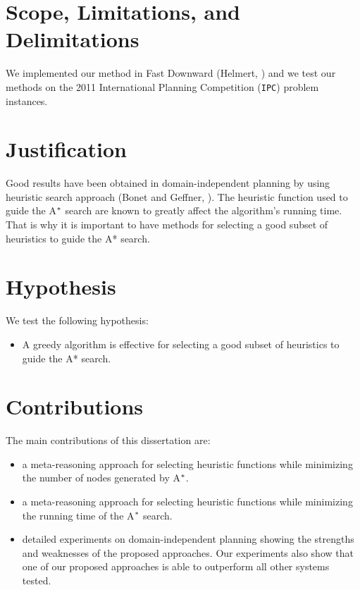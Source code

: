 \section{Scope, Limitations, and Delimitations}
\noindent
We implemented our method in Fast Downward (Helmert, \citeyear{helmert2006fast}) and we test our methods on the 2011 International Planning Competition (\texttt{IPC}) problem instances.

\section{Justification}
\noindent
Good results have been obtained in domain-independent planning by using heuristic search approach (Bonet and Geffner, \citeyear{bonet2001planning}). The heuristic function used to guide the A$\sp{*}$ search are known to greatly affect the algorithm's running time. That is why it is important to have methods for selecting a good subset of heuristics to guide the A* search.


\section{Hypothesis}
\noindent
We test the following hypothesis:
\begin{itemize}
\item A greedy algorithm is effective for selecting a good subset of heuristics to guide the A* search.
\end{itemize}

\section{Contributions}
\noindent
The main contributions of this dissertation are:
\begin{itemize}
\item a meta-reasoning approach for selecting heuristic functions while minimizing the number of nodes generated by A$\sp{*}$.

\item a meta-reasoning approach for selecting heuristic functions while minimizing the running time of the A$\sp{*}$ search. 

\item detailed experiments on domain-independent planning showing the strengths and weaknesses of the proposed approaches. Our experiments also show that one of our proposed approaches is able to outperform all other systems tested. 

\end{itemize}


